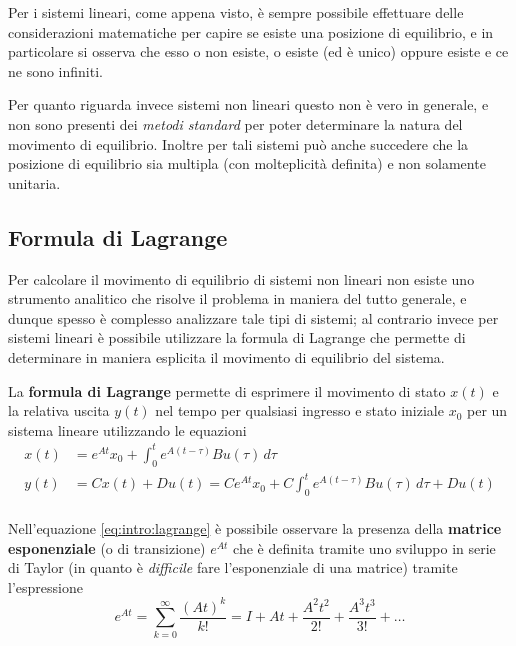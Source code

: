 		\begin{osservazione}
			Per i sistemi lineari, come appena visto, è sempre possibile effettuare delle considerazioni matematiche per capire se esiste una posizione di equilibrio, e in particolare si osserva che esso o non esiste, o esiste (ed è unico) oppure esiste e ce ne sono infiniti.
			
			Per quanto riguarda invece sistemi non lineari questo non è vero in generale, e non sono presenti dei \textit{metodi standard} per poter determinare la natura del movimento di equilibrio. Inoltre per tali sistemi può anche succedere che la posizione di equilibrio sia multipla (con molteplicità definita) e non solamente unitaria.
		\end{osservazione}		
		
	\subsection{Formula di Lagrange}
		Per calcolare il movimento di equilibrio di sistemi non lineari non esiste uno strumento analitico che risolve il problema in maniera del tutto generale, e dunque spesso è complesso analizzare tale tipi di sistemi; al contrario invece per sistemi lineari è possibile utilizzare la formula di Lagrange che permette di determinare in maniera esplicita il movimento di equilibrio del sistema.
		
		\begin{concetto}
			La \textbf{formula di Lagrange} permette di esprimere il movimento di stato $x(t)$ e la relativa uscita $y(t)$ nel tempo per qualsiasi ingresso e stato iniziale $x_0$ per un sistema lineare utilizzando le equazioni
			\begin{equation} \label{eq:intro:lagrange}
			\begin{aligned} 
				x(t) & = e^{At} x_0 + \int_0^t e^{A(t-\tau)} B u(\tau)\, d\tau \\
				y(t) & = Cx(t) + Du(t) = C e^{At} x_0 + C\int_0^t e^{A(t-\tau)} B u(\tau)\, d\tau + D u(t) \\
			\end{aligned}
			\end{equation}
		\end{concetto}
		Nell'equazione \ref{eq:intro:lagrange} è possibile osservare la presenza della \textbf{matrice esponenziale} (o di transizione) $e^{At}$ che è definita tramite uno sviluppo in serie di Taylor (in quanto è \textit{difficile} fare l'esponenziale di una matrice) tramite l'espressione
		\begin{equation}
			e^{At} = \sum_{k=0}^\infty \frac{(At)^k}{k!} = I + At + \frac{A^2t^2}{2!} + \frac{A^3t^3}{3!} + \dots 
		\end{equation}
		
